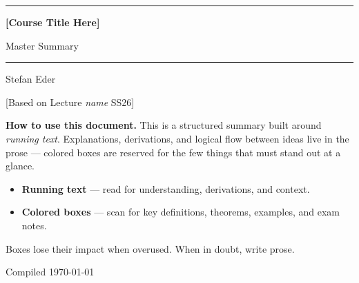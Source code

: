 \documentclass[11pt, oneside]{book}
\newcommand{\coursetitle}{[Course Title Here]}
\newcommand{\documenttype}{Master Summary}
\newcommand{\authorname}{Stefan Eder}
\newcommand{\basedon}{[Based on Lecture \emph{name} SS26]}
\begin{document}
\frontmatter  %


\thispagestyle{empty}
\vspace*{1.8cm}

\begin{center}
  {\color{accent}\rule{\linewidth}{1.8pt}}
  \vspace{0.65cm}

  {\fontsize{28}{34}\selectfont\bfseries\color{accent}\coursetitle\par}
  \vspace{0.25cm}
  {\large\color{gray!80!black}\documenttype\par}

  \vspace{0.55cm}
  {\color{accent!35}\rule{\linewidth}{0.5pt}}
  \vspace{0.55cm}

  {\large\authorname\par}
  \vspace{0.2cm}
  {\small\color{gray!70}\basedon\par}
\end{center}

\vspace{1.6cm}

\begin{center}
\begin{minipage}{0.84\textwidth}
  \small\color{gray!80!black}
  \textbf{How to use this document.}\enspace
  This is a structured summary built around \emph{running text}.
  Explanations, derivations, and logical flow between ideas live
  in the prose — colored boxes are reserved for the few things
  that must stand out at a glance.

  \medskip
  \begin{itemize}
    \item \textbf{Running text} — read for understanding, derivations, and context.
    \item \textbf{Colored boxes} — scan for key definitions, theorems, examples, and exam notes.
  \end{itemize}

  \smallskip
  Boxes lose their impact when overused. When in doubt, write prose.
\end{minipage}
\end{center}

\vfill
{\centering\small\color{gray!65} Compiled \today\par}
\clearpage
\end{document}
